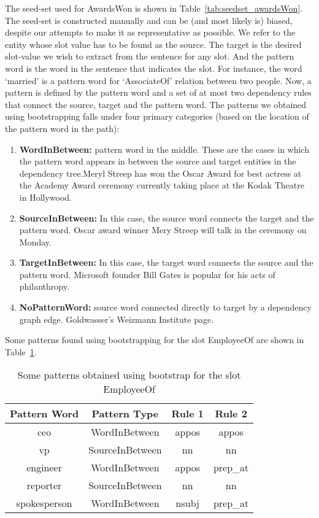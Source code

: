 \begin{itemize}
The seed-set used for AwardsWon is shown in Table~\ref{tab:seedset_awardsWon}. The seed-set is constructed manually and can be (and most likely is) biased, despite our attempts to make it as representative as possible. We refer to the entity whose slot value has to be found as the source. The target is the desired slot-value we wish to extract from the sentence for any slot. And the pattern word is the word in the sentence that indicates the slot. For instance, the word ‘married’ is a pattern word for ‘AssociateOf’ relation between two people. Now, a pattern is defined by the pattern word and a set of at most two dependency rules that connect the source, target and the pattern word. The patterns we obtained using bootstrapping falls under four primary categories (based on the location of the pattern word in the path): 
\begin{enumerate}
\item \textbf{WordInBetween:} pattern word in the middle. These are the cases in which the pattern word appears in between the source and target entities in the dependency tree.Meryl Streep has won the Oscar Award for best actress at the Academy Award ceremony currently taking place at the Kodak Theatre in Hollywood.
\item \textbf{SourceInBetween:} In this case, the source word connects the target and the pattern word. Oscar award winner Mery Streep will talk in the ceremony on Monday.
\item \textbf{TargetInBetween:} In this case, the target word connects the source and the pattern word. Microsoft founder Bill Gates is popular for his acts of philanthropy.
\item \textbf{NoPatternWord:} source word connected directly to target by a dependency graph edge. Goldwasser's Weizmann Institute page.
\end{enumerate}
Some patterns found using bootstrapping for the slot EmployeeOf are shown in Table~\ref{tab:patterns_employeeOf}. 

\begin{table}[ht]
\centering
\begin{tabular}{|c|c|c|c|}
\hline
Pattern Word & Pattern Type & Rule 1 & Rule 2 \\
\hline
ceo & WordInBetween & appos & appos \\
vp & SourceInBetween & nn & nn \\
engineer & WordInBetween & appos & prep\_at \\
reporter & SourceInBetween & nn & nn \\
spokesperson & WordInBetween & nsubj & prep\_at \\
\hline
\end{tabular}
\caption{Some patterns obtained using bootstrap for the slot EmployeeOf}
\label{tab:patterns_employeeOf}
\end{table}


\end{itemize}
